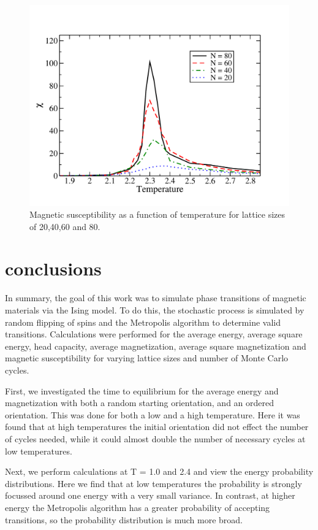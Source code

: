 \documentclass[prc,amsmath,twocolumn,superscriptaddress]{revtex4}
\begin{document}
\begin{figure}[b]
\includegraphics[scale=0.33]{var_mag.pdf}
\caption{Magnetic susceptibility as a function of temperature for lattice sizes of 20,40,60 and 80.}
\label{var_m}
\end{figure}


\section{conclusions}
\label{conc}
In summary, the goal of this work was to simulate phase transitions of magnetic materials via the Ising model. To do this, the stochastic process is simulated by random flipping of spins and the Metropolis algorithm to determine valid transitions. Calculations were performed for the average energy, average square energy, head capacity, average magnetization, average square magnetization and magnetic susceptibility for varying lattice sizes and number of Monte Carlo cycles.

First, we investigated the time to equilibrium for the average energy and magnetization with both a random starting orientation, and an ordered orientation. This was done for both a low and a high temperature. Here it was found that at high temperatures the initial orientation did not effect the number of cycles needed, while it could almost double the number of necessary cycles at low temperatures.

Next, we perform calculations at T = 1.0 and 2.4 and view the energy probability distributions. Here we find that at low temperatures the probability is strongly focussed around one energy with a very small variance. In contrast, at higher energy the Metropolis algorithm has a greater probability of accepting transitions, so the probability distribution is much more broad.
\end{document}
